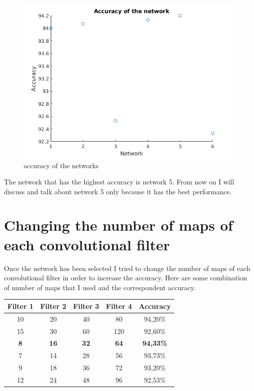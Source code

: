 \documentclass[]{report}
\begin{document}
\begin{figure}[h]
	\begin{center}
		\includegraphics[scale=0.6]{accuracy.png}
		\caption{accuracy of the networks}
		\label{fig:accuracyNetworks}
	\end{center}
\end{figure}

The network that has the highest accuracy is network 5. From now on I will discuss and talk about network 5 only because it has the best performance. 

\section{Changing the number of maps of each convolutional filter}

Once the network has been selected I tried to change the number of maps of each convolutional filter in order to increase the accuracy. Here are some combination of number of maps that I used and the correspondent accuracy.

\begin{table} [h]
\begin{center}
\begin{tabular}{|c|c|c|c|c|}
 \hline
 \textbf{Filter 1} & \textbf{Filter 2} & \textbf{Filter 3} & \textbf{Filter 4} & \textbf{Accuracy} \\ \hline
 10 & 20 & 40  & 80  & 94,20\%  \\ \hline
 15 & 30 & 60  & 120  & 92,60\%  \\ \hline
 \textbf{8} & \textbf{16} & \textbf{32}  & \textbf{64}  & \textbf{94,33\%}  \\ \hline
 7 & 14 & 28  & 56  & 93,73\%  \\ \hline
 9 & 18 & 36  & 72  & 93,20\%  \\ \hline
 12 & 24 & 48  & 96  & 92,53\%  \\ \hline
 
\end{tabular}
\end{center} 
\end{table}
  
\end{document}
